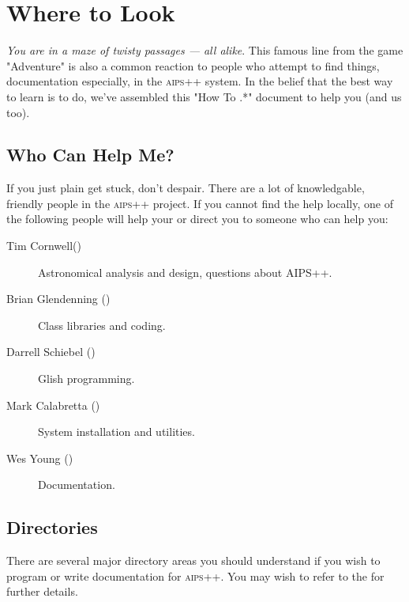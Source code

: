 
\chapter{Where to Look\label{HowTo.Intro}}
\textit{You are in a maze of twisty passages --- all alike}. This famous line
from the game "Adventure" is also a common reaction to people who
attempt to find things, documentation especially, in the \textsc{aips++}
system.
In the belief that the
best way to learn is to do, we've assembled this "How To .*" document
to help you (and us too).
\section{Who Can Help Me?}
If you just plain get stuck, don't despair. There are a lot of
knowledgable, friendly people in the \textsc{aips++} project. If you cannot
find the help locally, one of the following people will help your or 
direct you to someone who can help you:

\begin{description} 
\item[Tim Cornwell()]
Astronomical analysis and design, questions about AIPS++.
\item[Brian Glendenning ()]
Class libraries and coding.
\item[Darrell Schiebel ()]
Glish programming.
\item[Mark Calabretta ()]
System installation and utilities.
\item[Wes Young ()]
Documentation.
\end{description}

\section{Directories}

There are several major directory areas you should understand if you
wish to program or write documentation for \textsc{aips++}. You may wish
to refer to the 
for further details.

